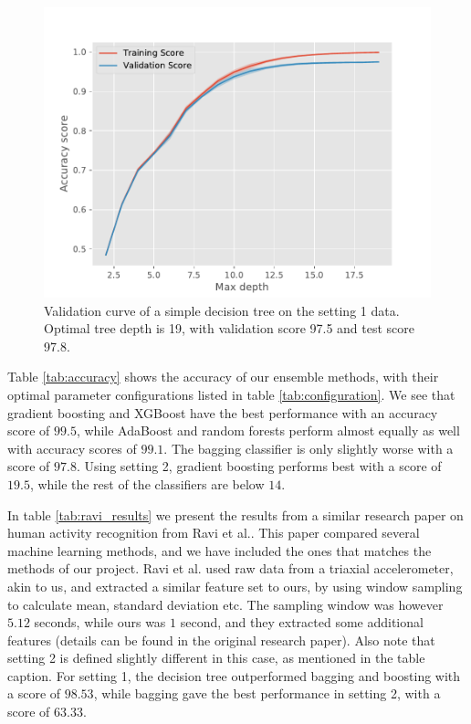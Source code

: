 \begin{figure}
    \centering
    \includegraphics[scale=0.6]{Figures/20191205-131043_simple_tree_tree_depth_opt.pdf}
    \caption{Validation curve of a simple decision tree on the setting 1 data. Optimal tree depth is 19, with validation score 97.5 and test score 97.8.}
    \label{fig:simple_tree_crossval}
\end{figure}

Table \ref{tab:accuracy} shows the accuracy of our ensemble methods, with their optimal parameter configurations listed in table \ref{tab:configuration}. We see that gradient boosting and XGBoost have the best performance with an accuracy score of $99.5$, while AdaBoost and random forests perform almost equally as well with accuracy scores of $99.1$. The bagging classifier is only slightly worse with a score of $97.8$. Using setting 2, gradient boosting performs best with a score of $19.5$, while the rest of the classifiers are below $14$. 

In table \ref{tab:ravi_results} we present the results from a similar research paper on human activity recognition from Ravi et al.\cite{ravi}. This paper compared several machine learning methods, and we have included the ones that matches the methods of our project. Ravi et al. used raw data from a triaxial accelerometer, akin to us, and extracted a similar feature set to ours, by using window sampling to calculate mean, standard deviation etc. The sampling window was however $5.12$ seconds, while ours was $1$ second, and they extracted some additional features (details can be found in the original research paper\cite{ravi}). Also note that setting 2 is defined slightly different in this case, as mentioned in the table caption. For setting 1, the decision tree outperformed bagging and boosting with a score of $98.53$, while bagging gave the best performance in setting 2, with a score of $63.33$.

